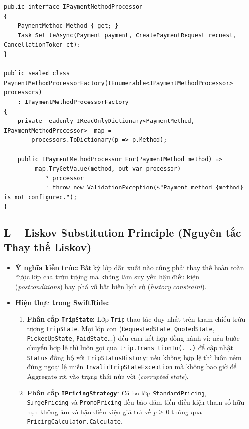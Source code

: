 \documentclass[12pt,a4paper]{article}
\begin{document}
\begin{lstlisting}[caption={OCP: Mo rong phuong thuc thanh toan moi ma khong sua doi PaymentCheckoutService}]
public interface IPaymentMethodProcessor
{
    PaymentMethod Method { get; }
    Task SettleAsync(Payment payment, CreatePaymentRequest request, CancellationToken ct);
}

public sealed class PaymentMethodProcessorFactory(IEnumerable<IPaymentMethodProcessor> processors)
    : IPaymentMethodProcessorFactory
{
    private readonly IReadOnlyDictionary<PaymentMethod, IPaymentMethodProcessor> _map =
        processors.ToDictionary(p => p.Method);

    public IPaymentMethodProcessor For(PaymentMethod method) =>
        _map.TryGetValue(method, out var processor)
            ? processor
            : throw new ValidationException($"Payment method {method} is not configured.");
}
\end{lstlisting}

\subsection{L -- Liskov Substitution Principle (Nguyên tắc Thay thế Liskov)}
\begin{itemize}[nosep]
    \item \textbf{Ý nghĩa kiến trúc:} Bất kỳ lớp dẫn xuất nào cũng phải thay thế hoàn toàn được lớp cha trừu tượng mà không làm suy yếu hậu điều kiện (\textit{postconditions}) hay phá vỡ bất biến lịch sử (\textit{history constraint}).
    \item \textbf{Hiện thực trong SwiftRide:}
    \begin{enumerate}[nosep]
        \item \textbf{Phân cấp \texttt{TripState}:} Lớp \texttt{Trip} thao tác duy nhất trên tham chiếu trừu tượng \texttt{TripState}. Mọi lớp con (\texttt{RequestedState}, \texttt{QuotedState}, \texttt{PickedUpState}, \texttt{PaidState}...) đều cam kết hợp đồng hành vi: nếu bước chuyển hợp lệ thì luôn gọi qua \texttt{trip.TransitionTo(...)} để cập nhật \texttt{Status} đồng bộ với \texttt{TripStatusHistory}; nếu không hợp lệ thì luôn ném đúng ngoại lệ miền \texttt{InvalidTripStateException} mà không bao giờ để Aggregate rơi vào trạng thái nửa vời (\textit{corrupted state}).
        \item \textbf{Phân cấp \texttt{IPricingStrategy}:} Cả ba lớp \texttt{StandardPricing}, \texttt{SurgePricing} và \texttt{PromoPricing} đều bảo đảm tiền điều kiện tham số hữu hạn không âm và hậu điều kiện giá trả về $p \ge 0$ thông qua \texttt{PricingCalculator.Calculate}.
    \end{enumerate}
\end{itemize}
\end{document}
